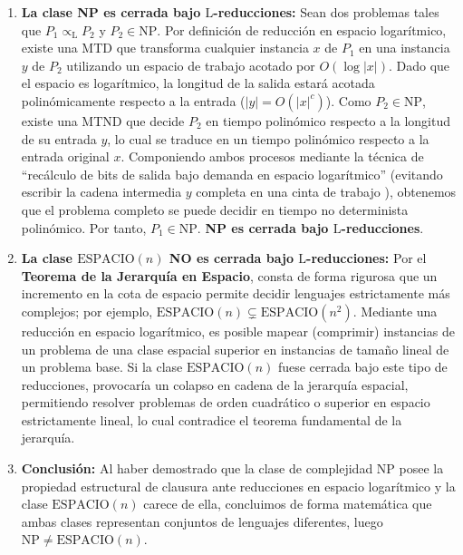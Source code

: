 \documentclass[12pt]{book} %
\begin{document}
\begin{enumerate}
\def\labelenumi{\arabic{enumi}.}
\item
  \textbf{La clase NP es cerrada bajo \(\text{L}\)-reducciones:} Sean
  dos problemas tales que \(P_1 \propto_{\text{L}} P_2\) y
  \(P_2 \in \text{NP}\). Por definición de reducción en espacio
  logarítmico, existe una MTD que transforma cualquier instancia \(x\)
  de \(P_1\) en una instancia \(y\) de \(P_2\) utilizando un espacio de
  trabajo acotado por \(O(\log |x|)\). Dado que el espacio es
  logarítmico, la longitud de la salida estará acotada polinómicamente
  respecto a la entrada (\(|y| = O(|x|^c)\)). Como
  \(P_2 \in \text{NP}\), existe una MTND que decide \(P_2\) en tiempo
  polinómico respecto a la longitud de su entrada \(y\), lo cual se
  traduce en un tiempo polinómico respecto a la entrada original \(x\).
  Componiendo ambos procesos mediante la técnica de ``recálculo de bits
  de salida bajo demanda en espacio logarítmico'' (evitando escribir la
  cadena intermedia \(y\) completa en una cinta de trabajo ), obtenemos
  que el problema completo se puede decidir en tiempo no determinista
  polinómico. Por tanto, \(P_1 \in \text{NP}\). \textbf{NP es cerrada
  bajo \(\text{L}\)-reducciones}.
\item
  \textbf{La clase \(\text{ESPACIO}(n)\) NO es cerrada bajo
  \(\text{L}\)-reducciones:} Por el \textbf{Teorema de la Jerarquía en
  Espacio}, consta de forma rigurosa que un incremento en la cota de
  espacio permite decidir lenguajes estrictamente más complejos; por
  ejemplo, \(\text{ESPACIO}(n) \subsetneq \text{ESPACIO}(n^2)\).
  Mediante una reducción en espacio logarítmico, es posible mapear
  (comprimir) instancias de un problema de una clase espacial superior
  en instancias de tamaño lineal de un problema base. Si la clase
  \(\text{ESPACIO}(n)\) fuese cerrada bajo este tipo de reducciones,
  provocaría un colapso en cadena de la jerarquía espacial, permitiendo
  resolver problemas de orden cuadrático o superior en espacio
  estrictamente lineal, lo cual contradice el teorema fundamental de la
  jerarquía.
\item
  \textbf{Conclusión:} Al haber demostrado que la clase de complejidad
  \(\text{NP}\) posee la propiedad estructural de clausura ante
  reducciones en espacio logarítmico y la clase \(\text{ESPACIO}(n)\)
  carece de ella, concluimos de forma matemática que ambas clases
  representan conjuntos de lenguajes diferentes, luego
  \textbf{\(\text{NP} \neq \text{ESPACIO}(n)\)}.
\end{enumerate}
\end{document}
